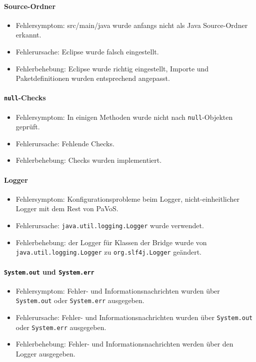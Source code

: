 \paragraph{Source-Ordner}
\begin{itemize}
	\item Fehlersymptom: src/main/java wurde anfangs nicht als Java Source-Ordner erkannt.
	\item Fehlerursache: Eclipse wurde falsch eingestellt.
	\item Fehlerbehebung: Eclipse wurde richtig eingestellt, Importe und Paketdefinitionen wurden entsprechend angepasst.
\end{itemize}

\paragraph{\texttt{null}-Checks}
\begin{itemize}
	\item Fehlersymptom: In einigen Methoden wurde nicht nach \texttt{null}-Objekten geprüft.
	\item Fehlerursache: Fehlende Checks.
	\item Fehlerbehebung: Checks wurden implementiert.
\end{itemize}

\paragraph{Logger}
\begin{itemize}
	\item Fehlersymptom: Konfigurationsprobleme beim Logger, nicht-einheitlicher Logger mit dem Rest von PaVoS.
	\item Fehlerursache: \texttt{java.util.logging.Logger} wurde verwendet.
	\item Fehlerbehebung: der Logger für Klassen der Bridge wurde von \texttt{java.util.logging.Logger} zu \texttt{org.slf4j.Logger} geändert.
\end{itemize}

\paragraph{\texttt{System.out} und \texttt{System.err}}
\begin{itemize}
	\item Fehlersymptom: Fehler- und Informationsnachrichten wurden über \texttt{System.out} oder \texttt{System.err} ausgegeben.
	\item Fehlerursache: Fehler- und Informationsnachrichten wurden über \texttt{System.out} oder \texttt{System.err} ausgegeben.
	\item Fehlerbehebung: Fehler- und Informationsnachrichten werden über den Logger ausgegeben.
\end{itemize}

